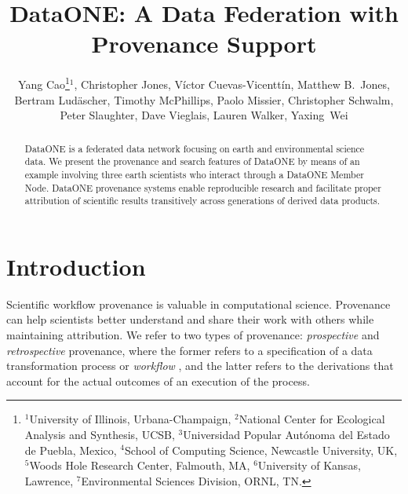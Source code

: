\documentclass[a4paper]{llncs}
\begin{document}
\mainmatter  

\title{DataONE: A Data Federation with Provenance Support}

\author{{Yang Cao\thanks{
$^1$University of Illinois, Urbana-Champaign, 
$^2$National Center for Ecological Analysis and Synthesis, UCSB,
$^3$Universidad Popular Aut\'onoma del Estado de Puebla, Mexico,
$^4$School of Computing Science, Newcastle  University, UK,
$^5$Woods Hole Research Center, Falmouth, MA,
$^6$University of Kansas, Lawrence,
$^7$Environmental Sciences Division, ORNL, TN.}$^1$,
Christopher Jones,  V\'ictor Cuevas-Vicentt\'in, Matthew B.\ Jones,  Bertram Lud\"ascher,  Timothy McPhillips,  Paolo Missier,   Christopher Schwalm,  Peter Slaughter,  Dave Vieglais,  Lauren Walker, Yaxing~Wei }}

\institute{\relax}

\maketitle

\begin{abstract}
  DataONE is a federated data network focusing on earth and environmental science data. We present the provenance and search features of DataONE by means of an example involving three earth scientists who interact through a DataONE Member Node. DataONE provenance systems enable reproducible research and facilitate proper attribution of scientific results transitively across generations of derived data products.
 \end{abstract}




\section{Introduction}

Scientific workflow provenance is valuable in computational science. Provenance can help scientists better understand and share their work with others while maintaining attribution. We refer to two types of provenance: \emph{prospective} and \emph{retrospective} provenance, where the former refers to a specification of a data transformation process or \emph{workflow} \cite{Freire2008}, and the latter refers to the derivations that account for the actual outcomes of an execution of the process.
\end{document}
